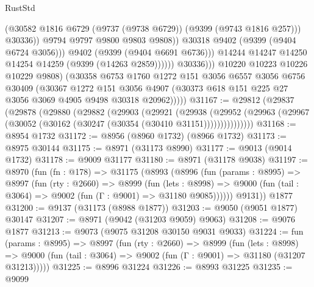 \begin{lexlean}{RustStd}
\begin{coremodule}
                                    (@30582
                                      @1816
                                      @6729
                                      (@9737 (@9738 @6729))
                                      (@9399 (@9743 @1816 @257)))
                                    @30336))
                                @9794
                                @9797
                                @9800
                                @9803
                                @9808))
                            @30318
                            @9402
                            (@9399 (@9404 @6724 @3056)))
                          @9402
                          (@9399 (@9404 @6691 @6736)))
                        @14244
                        @14247
                        @14250
                        @14254
                        @14259
                        (@9399 (@14263 @2859))))))
                @30336)))
          @10220
          @10223
          @10226
          @10229
          @9808)
        (@30358
          @6753
          @1760
          @1272
          @151
          @3056
          @6557
          @3056
          @6756
          @30409
          (@30367
            @1272
            @151
            @3056
            @4907
            (@30373 @618 @151 @225 @27 @3056 @3069 @4905 @9498 @30318 @20962)))))
@31167 := @29812
    (@29837
      (@29878
        (@29880
          (@29882
            (@29903
              (@29921
                (@29938
                  (@29952
                    (@29963 (@29967 (@30052 (@30162 (@30247 (@30354 (@30410 @31151)))))))))))))))
@31168 := @8954 @1732
@31172 := @8956 (@8960 @1732) (@8966 @1732)
@31173 := @8975 @30144
@31175 := @8971 (@31173 @8990)
@31177 := @9013 (@9014 @1732)
@31178 := @9009 @31177
@31180 := @8971 (@31178 @9038)
@31197 := @8970
    (fun (fn : @178) =>
    @31175
      (@8993
        (@8996
          (fun (params : @8995) =>
          @8997
            (fun (rty : @2660) =>
            @8999
              (fun (lets : @8998) =>
              @9000 (fun (tail : @3064) => @9002 (fun (Γ : @9001) => @31180 @9085))))))
        @9131))
    @1877
@31200 := @9137 (@31173 (@8988 @1877))
@31203 := @9050 (@9051 @1877) @30147
@31207 := @8971 (@9042 (@31203 @9059) @9063)
@31208 := @9076 @1877
@31213 := @9073 (@9075 @31208 @30150 @9031 @9033)
@31224 := fun (params : @8995) =>
  @8997
    (fun (rty : @2660) =>
    @8999
      (fun (lets : @8998) =>
      @9000 (fun (tail : @3064) => @9002 (fun (Γ : @9001) => @31180 (@31207 @31213)))))
@31225 := @8996 @31224
@31226 := @8993 @31225
@31235 := @9099

\end{coremodule}
\end{lexlean}
